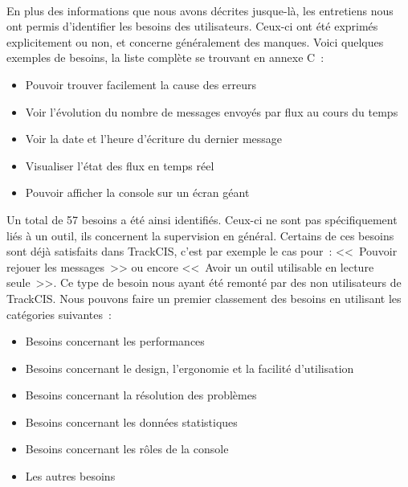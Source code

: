 			\paragraph{}%
			En plus des informations que nous avons décrites jusque-là, les entretiens
			nous ont permis d'identifier les besoins des utilisateurs. Ceux-ci ont été
			exprimés explicitement ou non, et concerne généralement des manques. Voici
			quelques exemples de besoins, la liste complète se trouvant en annexe C~:
			\begin{itemize}
			  \item Pouvoir trouver facilement la cause des erreurs
			  \item Voir l'évolution du nombre de messages envoyés par flux au cours du
			  temps
			  \item Voir la date et l'heure d'écriture du dernier message
			  \item Visualiser l'état des flux en temps réel
			  \item Pouvoir afficher la console sur un écran géant
			\end{itemize}
			Un total de 57 besoins a été ainsi identifiés. Ceux-ci ne sont pas
			spécifiquement liés à un outil, ils concernent la supervision
			en général. Certains de ces besoins sont déjà satisfaits dans
			TrackCIS, c'est par exemple le cas pour~: <<~Pouvoir rejouer les
			messages~>> ou encore <<~Avoir un outil utilisable en lecture seule~>>. Ce
			type de besoin nous ayant été remonté par des non utilisateurs de TrackCIS. Nous
			pouvons faire un premier classement des besoins en utilisant les catégories
			suivantes~:
			\begin{itemize}
			  \item Besoins concernant les performances
			  \item Besoins concernant le design, l'ergonomie et la facilité
			  d'utilisation
			  \item Besoins concernant la résolution des problèmes
			  \item Besoins concernant les données statistiques
			  \item Besoins concernant les rôles de la console
			  \item Les autres besoins
			\end{itemize}
			
